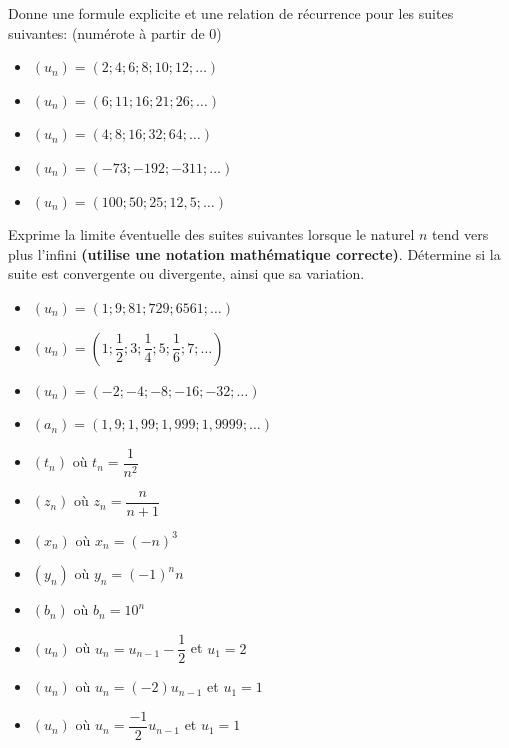 \documentclass[a4paper,12pt]{report}
\begin{document}
\begin{exercice}
Donne une formule explicite et une relation de récurrence pour les suites
suivantes: (numérote à partir de 0)
\par \setlength{\columnseprule}{0 pt}
          \begin{minipage}[t]{\linewidth}
          \begin{multicols}{2}
\begin{itemize}
\item \((u_n)=(2;4;6;8;10;12;\ldots)\)
\item \((u_n)=(6;11;16;21;26;\ldots)\)
\item \((u_n)=(4;8;16;32;64;\ldots)\)
\item \((u_n)=(-73;-192;-311;\ldots)\)
\item \((u_n)=(100;50;25;12,5;\ldots)\)
\end{itemize}


\end{multicols}\end{minipage}
\end{exercice}

\begin{exercice}
Exprime la limite éventuelle des suites suivantes lorsque le naturel \(n\) tend vers plus
l’infini \textbf{(utilise une notation mathématique correcte)}. Détermine si la suite est
convergente ou divergente, ainsi que sa variation.
\par \setlength{\columnseprule}{0 pt}
          \begin{minipage}[t]{\linewidth}
          \begin{multicols}{2}
\begin{itemize}
\item \((u_n)=(1;9;81;729;6561;\ldots)\)
\item \((u_n)=(1;\dfrac{1}{2};3;\dfrac{1}{4};5;\dfrac{1}{6};7;\ldots)\)
\item \((u_n)=(-2;-4;-8;-16;-32;\ldots)\)
\item \((a_n)=(1,9;1,99;1,999;1,9999;\ldots)\)
\item \((t_n)\) où \(t_n=\dfrac{1}{n^2}\)
\item \((z_n)\) où \(z_n=\dfrac{n}{n+1}\)
\item \((x_n)\) où \(x_n=(-n)^3\)
\item \((y_n)\) où \(y_n=(-1)^nn\)
\item \((b_n)\) où \(b_n=10^n\)
\item \((u_n)\) où \(u_n=u_{n-1}-\dfrac{1}{2}\) et \(u_1=2\)
\item \((u_n)\) où \(u_n=(-2)u_{n-1}\) et \(u_1=1\)
\item \((u_n)\) où \(u_n=\dfrac{-1}{2}u_{n-1}\) et \(u_1=1\)
\end{itemize}


\end{multicols}\end{minipage}
\end{exercice}
\end{document}
